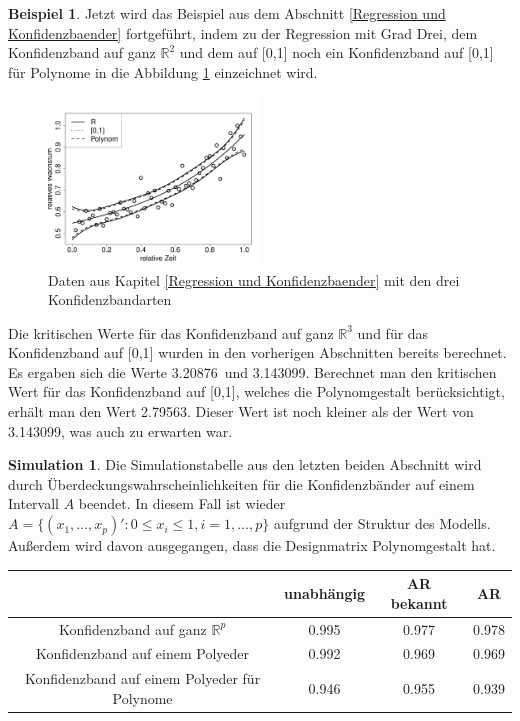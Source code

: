 \documentclass[12pt,a4paper]{article}
\theoremstyle{definition}
\newtheorem{Beispiel}[Definition]{Beispiel}
\theoremstyle{definition}
\theoremstyle{definition}
\newtheorem{Simulation}[Definition]{Simulation}
\theoremstyle{definition}
\newcommand{\cR}{3.20876}
\newcommand{\cA}{3.143099}
\newcommand{\cAP}{2.79563}
\newcommand{\UeberRR}{0.995}
\newcommand{\UeberRMinmax}{0.992}
\newcommand{\UeberRMinmaxPolyfast}{0.946}
\newcommand{\UeberARbekanntR}{0.977}
\newcommand{\UeberARbekanntMinmax}{0.969}
\newcommand{\UeberARbekanntMinmaxPolyfast}{0.955}
\newcommand{\UeberARR}{0.978}
\newcommand{\UeberARMinmax}{0.969}
\newcommand{\UeberARMinmaxPolyfast}{0.939}
\begin{document}
\begin{Beispiel}
Jetzt wird das Beispiel aus dem Abschnitt \ref{Regression und Konfidenzbaender} fortgeführt, indem zu der Regression mit Grad Drei, dem Konfidenzband auf ganz $\mathbb{R}^2$ und dem auf [0,1] noch ein Konfidenzband auf [0,1] für Polynome in die Abbildung \ref{KB-poly-BSP} einzeichnet wird.

\begin{figure}[H] 
  \centering
     \includegraphics[width=0.5\textwidth]{Bsp-KB-poly}
  \caption{Daten aus Kapitel \ref{Regression und Konfidenzbaender} mit den drei Konfidenzbandarten}
  \label{KB-poly-BSP}
\end{figure}

Die kritischen Werte für das Konfidenzband auf ganz $\mathbb{R}^{3}$ und für das Konfidenzband auf [0,1] wurden in den vorherigen Abschnitten bereits berechnet. Es ergaben sich die Werte \cR ~und \cA . Berechnet man den kritischen Wert für das Konfidenzband auf [0,1], welches die Polynomgestalt berücksichtigt, erhält man den Wert \cAP . Dieser Wert ist noch kleiner als der Wert von \cA , was auch zu erwarten war.
\end{Beispiel}

\begin{Simulation}
Die Simulationstabelle aus den letzten beiden Abschnitt wird durch Überdeckungswahrscheinlichkeiten für die Konfidenzbänder auf einem Intervall $A$ beendet. In diesem Fall ist wieder $A = \{ (x_1, \ldots, x_p)' : 0 \leq x_i \leq 1, i=1, \ldots, p \}$ aufgrund der Struktur des Modells. Außerdem wird davon ausgegangen, dass die Designmatrix Polynomgestalt hat.

\begin{center}
\begin{tabular}{|c|c|c|c|}
\hline 
& unabhängig & AR bekannt & AR \\ 
\hline 
Konfidenzband auf ganz $\mathbb{R}^{p}$		 & \UeberRR		  & \UeberARbekanntR & \UeberARR \\ 
\hline 
Konfidenzband auf einem Polyeder	 & \UeberRMinmax  & \UeberARbekanntMinmax & \UeberARMinmax \\ 
\hline 
Konfidenzband auf einem Polyeder für Polynome  & \UeberRMinmaxPolyfast & \UeberARbekanntMinmaxPolyfast & \UeberARMinmaxPolyfast \\ 
\hline 
\end{tabular} 
\end{center}

\end{Simulation}
\end{document}
